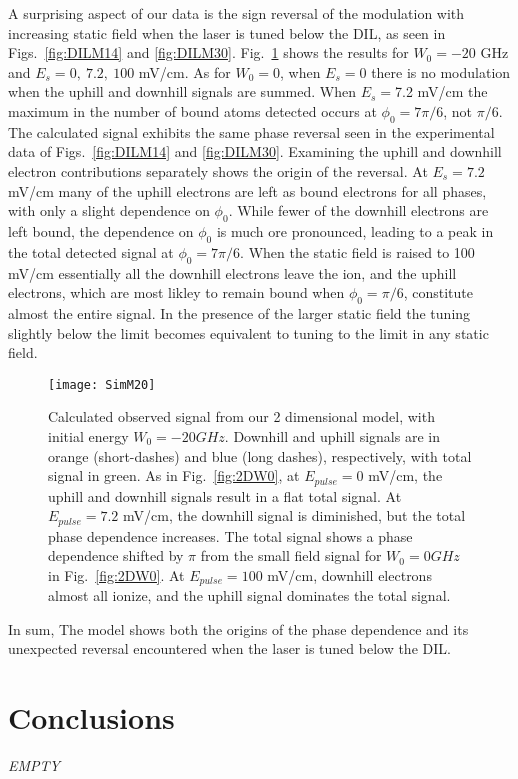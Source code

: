 \documentclass[aps,pra,preprint,groupedaddress]{revtex4-1}
\begin{document}
A surprising aspect of our data is the sign reversal of the modulation with increasing static field when the laser is tuned below the DIL, as seen in Figs.~\ref{fig:DILM14} and \ref{fig:DILM30}. Fig.~\ref{fig:2DW20} shows the results for $W_0 = -20$ GHz and $E_s = 0, ~7.2, ~100$ mV/cm. As for $W_0=0$, when $E_s=0$ there is no modulation when the uphill and downhill signals are summed. When $E_s=$7.2 mV/cm the maximum in the number of bound atoms detected occurs at $\phi_0=7\pi/6$, not $\pi/6$. The calculated signal exhibits the same phase reversal seen in the experimental data of Figs.~\ref{fig:DILM14} and \ref{fig:DILM30}. Examining the uphill and downhill electron contributions separately shows the origin of the reversal. At $E_s = 7.2$ mV/cm many of the uphill electrons are left as bound electrons for all phases, with only a slight dependence on $\phi_0$. While fewer of the downhill electrons are left bound, the dependence on $\phi_0$ is much ore pronounced, leading to a peak in the total detected signal at $\phi_0=7\pi/6$. When the static field is raised to 100 mV/cm essentially all the downhill electrons leave the ion, and the uphill electrons, which are most likley to remain bound when $\phi_0=\pi/6$, constitute almost the entire signal. In the presence of the larger static field the tuning slightly below the limit becomes equivalent to tuning to the limit in any static field.

\begin{figure}
	\texttt{[image: SimM20]}
	\caption{Calculated observed signal from our 2 dimensional model, with initial energy $W_0 = -20 GHz$. Downhill and uphill signals are in orange (short-dashes) and blue (long dashes), respectively, with total signal in green. As in Fig.~\ref{fig:2DW0}, at $E_{pulse} = 0$ mV/cm, the uphill and downhill signals result in a flat total signal. At $E_{pulse} = 7.2$ mV/cm, the downhill signal is diminished, but the total phase dependence increases. The total signal shows a phase dependence shifted by $\pi$ from the small field signal for $W_0 = 0 GHz$ in Fig.~\ref{fig:2DW0}. At $E_{pulse} = 100$ mV/cm, downhill electrons almost all ionize, and the uphill signal dominates the total signal.}
	\label{fig:2DW20}
\end{figure}

In sum, The model shows both the origins of the phase dependence and its unexpected reversal encountered when the laser is tuned below the DIL.

\section{\label{sec:conc} Conclusions}

\emph{EMPTY}

%
\end{document}
